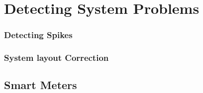\chapter{Detecting System Problems}
\subsection{Detecting Spikes}





\subsection{System layout Correction}



\section{Smart Meters}



